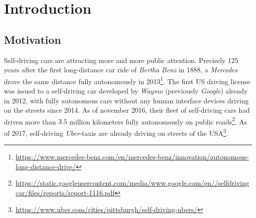 
\chapter{Introduction} %

\label{ch:intro} %


\newcommand{\keyword}[1]{\textit{#1}}
\newcommand{\tabhead}[1]{\textbf{#1}}
\newcommand{\code}[1]{\texttt{#1}}
\newcommand{\file}[1]{\texttt{\bfseries#1}}
\newcommand{\option}[1]{\texttt{\itshape#1}}
\newcommand{\batchnorm}{batch normalization }
\newcommand{\Batchnorm}{Batch normalization }



\section{Motivation}

Self-driving cars are attracting more and more public attention. Precisely 125 years after the first long-distance car ride of \keyword{Bertha Benz} in 1888, a \keyword{Mercedes} drove the same distance fully autonomously in 2013\footnote{\url{https://www.mercedes-benz.com/en/mercedes-benz/innovation/autonomous-long-distance-drive/}}.
The first US driving license was issued to a self-driving car developed by \keyword{Waymo} (previously \keyword{Google}) already in 2012, with fully autonomous cars without any human interface devices driving on the streets since 2014. As of november 2016, their fleet of self-driving cars had driven more than $3.5$ million kilometers fully autonomously on public roads\footnote{\url{https://static.googleusercontent.com/media/www.google.com/en//selfdrivingcar/files/reports/report-1116.pdf}}. As of 2017, self-driving \keyword{Uber}-taxis are already driving on streets of the USA\footnote{\url{https://www.uber.com/cities/pittsburgh/self-driving-ubers/}}. 


